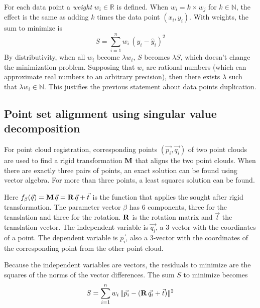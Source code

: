 For each data point a \emph{weight} $w_i \in \mathds{R}$ is defined. When $w_i = k \times w_j$ for $k \in \mathds{N}$, the effect is the same as adding $k$ times the data point $(x_i, y_i)$. With weights, the sum to minimize is
\begin{equation}
S = \sum_{i=1}^{n} w_i \, (y_i - \hat{y}_i)^2
\end{equation}
By distributivity, when all $w_i$ become $\lambda w_i$, $S$ becomes $\lambda S$, which doesn't change the minimization problem. Supposing that $w_i$ are rational numbers (which can approximate real numbers to an arbitrary precision), then there exists $\lambda$ such that $\lambda w_i \in \mathds{N}$. This justifies the previous statement about data points duplication. 

\subsubsection{}

\subsection{Point set alignment using singular value decomposition} \label{sec:lsq_align}
For point cloud registration, corresponding points $(\vec{p_i}, \vec{q_i})$ of two point clouds are used to find a rigid transformation $\mathbf{M}$ that aligns the two point clouds. When there are exactly three pairs of points, an exact solution can be found using vector algebra. \cite{Horn1986} For more than three points, a least squares solution can be found.

Here $f_{\beta}(\vec{q}) = \mathbf{M} \, \vec{q} = \mathbf{R} \, \vec{q} + \vec{t}$ is the function that applies the sought after rigid transformation. The parameter vector $\beta$ has 6 components, three for the translation and three for the rotation. $\mathbf{R}$ is the rotation matrix and $\vec{t}$ the translation vector. The independent variable is $\vec{q_i}$, a 3-vector with the coordinates of a point. The dependent variable is $\vec{p_i}$, also a 3-vector with the coordinates of the corresponding point from the other point cloud.

Because the independent variables are vectors, the residuals to minimize are the squares of the norms of the vector differences. The sum $S$ to minimize becomes
\begin{equation}
S = \sum_{i=1}^{n} w_i \, \| \vec{p_i} - (\mathbf{R} \, \vec{q_i} + \vec{t}) \|^2
\end{equation}

